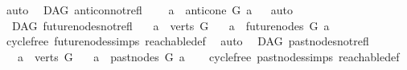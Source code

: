 \begin{isabellebody}
\ auto%
\endisatagproof
{\isafoldproof}%
%
\isadelimproof
%
\endisadelimproof
\isanewline
\isanewline
{}\isamarkupfalse%
\ {\isacharparenleft}{\kern0pt}\ DAG{\isacharparenright}{\kern0pt}\ anticon{\isacharunderscore}{\kern0pt}not{\isacharunderscore}{\kern0pt}refl{\isacharcolon}{\kern0pt}\isanewline
\ \ \ \ {\isachardoublequoteopen}a\ {\isasymnotin}\ {\isacharparenleft}{\kern0pt}anticone\ G\ a{\isacharparenright}{\kern0pt}{\isachardoublequoteclose}%
\isadelimproof
\ %
\endisadelimproof
%
\isatagproof
{}\isamarkupfalse%
\ auto%
\endisatagproof
{\isafoldproof}%
%
\isadelimproof
%
\endisadelimproof
%
\isadelimdocument
%
\endisadelimdocument
%
\isatagdocument
%
\isamarkuptrue%
%
\endisatagdocument
{\isafolddocument}%
%
\isadelimdocument
%
\endisadelimdocument
{}\isamarkupfalse%
\ {\isacharparenleft}{\kern0pt}\ DAG{\isacharparenright}{\kern0pt}\ future{\isacharunderscore}{\kern0pt}nodes{\isacharunderscore}{\kern0pt}not{\isacharunderscore}{\kern0pt}refl{\isacharcolon}{\kern0pt}\isanewline
\ \ \ {\isachardoublequoteopen}a\ {\isasymin}\ verts\ G{\isachardoublequoteclose}\isanewline
\ \ \ {\isachardoublequoteopen}a\ {\isasymnotin}\ future{\isacharunderscore}{\kern0pt}nodes\ G\ a{\isachardoublequoteclose}\isanewline
%
\isadelimproof
\ \ %
\endisadelimproof
%
\isatagproof
{}\isamarkupfalse%
\ cycle{\isacharunderscore}{\kern0pt}free\ future{\isacharunderscore}{\kern0pt}nodes{\isachardot}{\kern0pt}simps\ reachable{\isacharunderscore}{\kern0pt}def\ \isamarkupfalse%
\ auto%
\endisatagproof
{\isafoldproof}%
%
\isadelimproof
%
\endisadelimproof
%
\isadelimdocument
%
\endisadelimdocument
%
\isatagdocument
%
\isamarkuptrue%
%
\endisatagdocument
{\isafolddocument}%
%
\isadelimdocument
%
\endisadelimdocument
{}\isamarkupfalse%
\ {\isacharparenleft}{\kern0pt}\ DAG{\isacharparenright}{\kern0pt}\ past{\isacharunderscore}{\kern0pt}nodes{\isacharunderscore}{\kern0pt}not{\isacharunderscore}{\kern0pt}refl{\isacharcolon}{\kern0pt}\isanewline
\ \ \ {\isachardoublequoteopen}a\ {\isasymin}\ verts\ G{\isachardoublequoteclose}\isanewline
\ \ \ {\isachardoublequoteopen}a\ {\isasymnotin}\ past{\isacharunderscore}{\kern0pt}nodes\ G\ a{\isachardoublequoteclose}\isanewline
%
\isadelimproof
\ \ %
\endisadelimproof
%
\isatagproof
{}\isamarkupfalse%
\ cycle{\isacharunderscore}{\kern0pt}free\ past{\isacharunderscore}{\kern0pt}nodes{\isachardot}{\kern0pt}simps\ reachable{\isacharunderscore}{\kern0pt}def\ \isamarkupfalse%

\end{isabellebody}
